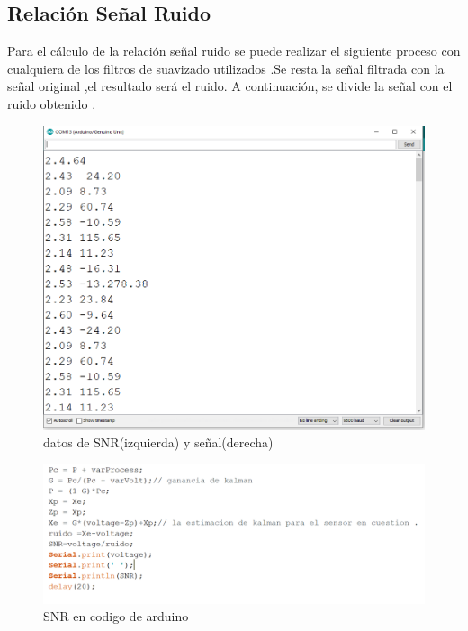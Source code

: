 \documentclass[10pt,a4paper]{article}
\begin{document}
\subsection{Relación Señal Ruido}
Para el cálculo de la relación señal ruido se puede realizar el siguiente proceso con cualquiera de los filtros de suavizado utilizados .Se resta la señal filtrada con la señal original ,el resultado será el ruido. A continuación, se divide la señal con el ruido obtenido .
\begin{figure}[H]
\centering
\includegraphics[scale=0.35]{snr.png}
\caption{datos de SNR(izquierda) y señal(derecha)}
\end{figure}
\begin{figure}[H]
\centering
\includegraphics[scale=0.35]{snr2.png}
\caption{SNR en codigo de arduino}
\end{figure}
\end{document}
